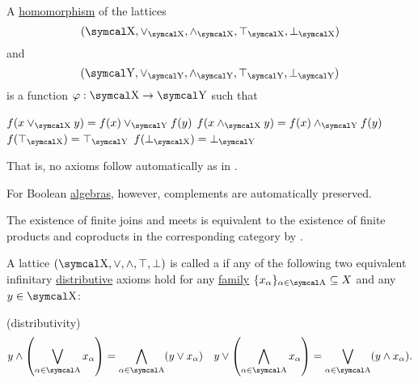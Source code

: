 \begin{proposition}\label{thm:lattice_homomorphism}
  A \hyperref[def:first_order_homomorphism]{homomorphism} of the lattices
  \begin{equation*}
    (\CX, \vee_{\CX}, \wedge_{\CX}, \top_{\CX}, \bot_{\CX})
  \end{equation*}
  and
  \begin{equation*}
    (\CY, \vee_{\CY}, \wedge_{\CY}, \top_{\CY}, \bot_{\CY})
  \end{equation*}
  is a function \( \varphi: \CX \to \CY \) such that
  \begin{propenum}
     \( f(x \vee_{\CX} y) = f(x) \vee_{\CY} f(y) \)
     \( f(x \wedge_{\CX} y) = f(x) \wedge_{\CY} f(y) \)
     \( f(\top_{\CX}) = \top_{\CY} \)
     \( f(\bot_{\CX}) = \bot_{\CY} \)
  \end{propenum}

  That is, no axioms follow automatically as in .

  For Boolean \hyperref[def:boolean_algebra]{algebras}, however, complements are automatically preserved.
\end{proposition}

\begin{remark}\label{def:lattice_categorical_product}
  The existence of finite joins and meets is equivalent to the existence of finite products and coproducts in the corresponding category by .
\end{remark}

\begin{definition}\label{def:distributive_lattice}\cite{nLab:distributive_lattice}
  A lattice \( (\CX, \vee, \wedge, \top, \bot) \) is called a  if any of the following two equivalent infinitary \hyperref[def:algebraic_theory/distributivity]{distributive} axioms hold for any \hyperref[def:indexed_family]{family} \( \{ x_\al \}_{\al \in \CA} \subseteq X \) and any \( y \in \CX \):
  \begin{description}
    (distributivity)
    \begin{align*}
      y \wedge \left( \bigvee_{\al \in \CA} x_\al \right) = \bigwedge_{\al \in \CA} (y \vee x_\al)
      &&
      y \vee \left( \bigwedge_{\al \in \CA} x_\al \right) = \bigvee_{\al \in \CA} (y \wedge x_\al).
    \end{align*}
  \end{description}
\end{definition}

